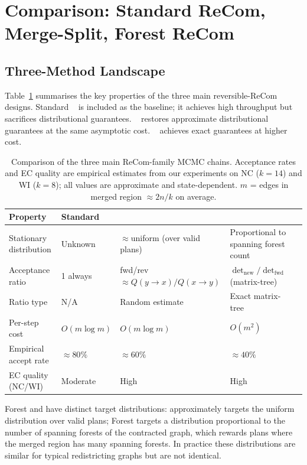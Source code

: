 \section{Comparison: Standard ReCom, Merge-Split, Forest ReCom}
\label{sec:comparison}

\subsection{Three-Method Landscape}

Table~\ref{tab:comparison} summarises the key properties of the three
main reversible-ReCom designs.
Standard \recom{}~\citep{deford2021} is included as the baseline; it
achieves high throughput but sacrifices distributional guarantees.
\mergesplit{}~\citep{janson2022} restores approximate distributional
guarantees at the same asymptotic cost.
\forestrecom{}~\citep{mccartan2020,dellaLibera2026forestRecom} achieves
exact guarantees at higher cost.

\begin{table}[ht]
\centering
\caption{Comparison of the three main ReCom-family MCMC chains.
  Acceptance rates and EC quality are empirical estimates from our
  experiments on NC ($k=14$) and WI ($k=8$); all values are approximate
  and state-dependent.
  $m$ = edges in merged region $\approx 2n/k$ on average.}
\label{tab:comparison}
\renewcommand{\arraystretch}{1.35}
\begin{tabular}{@{}lllll@{}}
\toprule
Property & Standard \recom{} & \mergesplit{} & \forestrecom{} \\
\midrule
Stationary distribution
  & Unknown
  & $\approx$uniform (over valid plans)
  & Proportional to spanning forest count \\
Acceptance ratio
  & 1 always
  & fwd/rev $\approx Q(y{\to}x)/Q(x{\to}y)$
  & $\det_{\mathrm{new}}/\det_{\mathrm{fwd}}$ (matrix-tree) \\
Ratio type
  & N/A
  & Random estimate
  & Exact matrix-tree \\
Per-step cost
  & $O(m \log m)$
  & $O(m \log m)$
  & $O(m^2)$ \\
Empirical accept rate
  & $\approx\!80\%$
  & $\approx\!60\%$
  & $\approx\!40\%$ \\
EC quality (NC/WI)
  & Moderate
  & High
  & High \\
\bottomrule
\end{tabular}
\end{table}

\begin{remark}
Forest \recom{} and \mergesplit{} have distinct target distributions:
\mergesplit{} approximately targets the uniform distribution over valid plans;
Forest \recom{} targets a distribution proportional to the number of spanning
forests of the contracted graph, which rewards plans where the merged region
has many spanning forests.
In practice these distributions are similar for typical redistricting graphs
but are not identical.
\end{remark}

